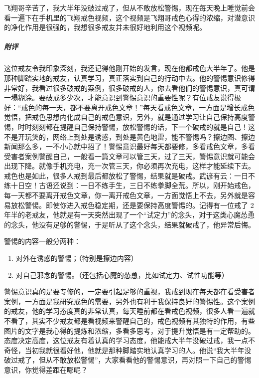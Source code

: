\begin{case}
    飞翔哥辛苦了，我大半年没破过戒了，但从不敢放松警惕，现在每天晚上睡觉前会看一遍下在手机里的飞翔戒色视频，这个视频是飞翔哥戒色心得的浓缩，对潜意识的净化作用是很强的，我想很多戒友并未很好地利用这个视频呢。
    \subparagraph{附评} 这位戒友令我印象深刻，我还记得他刚开始的发言，现在他都戒色大半年了。他是那种脚踏实地的戒友，认真学习，真正落实到自己的行动中去。他的警惕意识修得非常好，我看过很多破戒的案例，很多破戒的人，你去看他们的警惕意识，真可谓一塌糊涂。要破戒多少次，才能意识到警惕意识的重要性呢？有位戒友说得极好：“戒色的每一天，都不要离开戒色文章！”每天看戒色文章，一方面是增长戒色觉悟，把戒色思想内化成自己的戒色意识，另外，就是通过学习让自己保持高度警惕，时时刻刻都在提醒自己保持警惕，放松警惕的话，下一个破戒的就是自己！这不是开玩笑的，网络上到处是诱惑，到处是黄色地雷，能不警惕吗？擦边图、擦边新闻那么多，一不小心就中招了！警惕意识最好每天都要修，多看戒色文章，多看受害者案例警醒自己，一般看一篇文章可以管三天，过了三天，警惕意识就可能会出现下降。就像手机充电，充一次管三天，你必须再次充电，这样才能延续下去。戒色也是如此，很多人戒到最后都放松了警惕，结果就是破戒。武谚有云：一日不练十日空！古语还说到：一日不练手生，三日不练拳脚全荒。所以，刚开始戒色，每一天都不要离开戒色文章，你一离开戒色文章，一方面觉悟上不去，另外就是容易放松警惕。即使你进入戒色稳定期，还是要保持高度警惕的。记得有一位戒了 2 年半的老戒友，他就是有一天突然出现了一个“试定力”的念头，对于这类心魔怂恿的念头，他没有足够的警惕，于是听从了这个念头，结果就破戒了，他异常后悔。

    警惕的内容一般分两种：

    \begin{enumerate}
        \item 对外在诱惑的警惕；（特别是擦边内容）
        \item 对自己邪念的警惕。（还包括心魔的怂恿，比如试定力、试性功能等）
    \end{enumerate}

    警惕意识真的是要专修的，一定要引起足够的重视，我戒到现在每天都在看受害者案例，一方面是我研究戒色的需要，另外也有利于我保持良好的警惕性。这个案例的戒友，他的学习态度真的非常认真，每天睡前都在看戒色视频，很多人看一遍就不看了，其实不少戒友都是看视频来警醒自己的，戒色视频有其独特的作用，有些图片的文字是我心得的提炼和浓缩，多看多思考，对于提升觉悟是有一定帮助的。态度决定高度，这位戒友有着认真的学习态度，他能戒大半年没破过戒，我一点不奇怪，当初我就很看好他，他就是那种脚踏实地认真学习的人。他说“我大半年没破过戒了，但从不敢放松警惕”，大家看看他的警惕意识，再对照一下自己的警惕意识，你觉得差距在哪呢？
\end{case}

